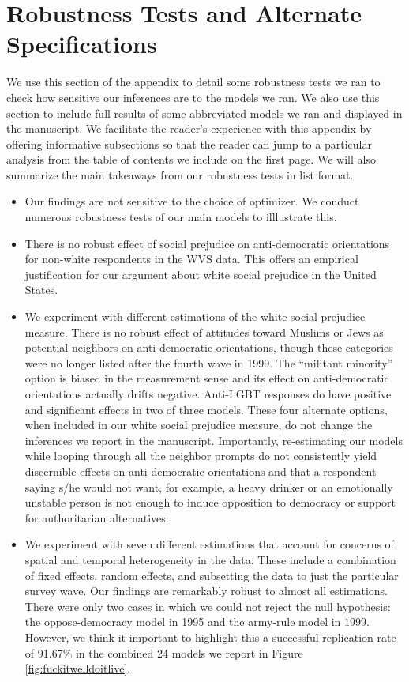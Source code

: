 \documentclass[11pt,]{article}
\providecommand{\tightlist}{%
\setlength{\itemsep}{0pt}\setlength{\parskip}{0pt}}
\begin{document}
\hypertarget{robustness-tests-and-alternate-specifications}{%
\section{Robustness Tests and Alternate
Specifications}\label{robustness-tests-and-alternate-specifications}}

We use this section of the appendix to detail some robustness tests we
ran to check how sensitive our inferences are to the models we ran. We
also use this section to include full results of some abbreviated models
we ran and displayed in the manuscript. We facilitate the reader's
experience with this appendix by offering informative subsections so
that the reader can jump to a particular analysis from the table of
contents we include on the first page. We will also summarize the main
takeaways from our robustness tests in list format.

\begin{itemize}
\tightlist
\item
  Our findings are not sensitive to the choice of optimizer. We conduct
  numerous robustness tests of our main models to illlustrate this.
\item
  There is no robust effect of social prejudice on anti-democratic
  orientations for non-white respondents in the WVS data. This offers an
  empirical justification for our argument about white social prejudice
  in the United States.
\item
  We experiment with different estimations of the white social prejudice
  measure. There is no robust effect of attitudes toward Muslims or Jews
  as potential neighbors on anti-democratic orientations, though these
  categories were no longer listed after the fourth wave in 1999. The
  ``militant minority'' option is biased in the measurement sense and
  its effect on anti-democratic orientations actually drifts negative.
  Anti-LGBT responses do have positive and significant effects in two of
  three models. These four alternate options, when included in our white
  social prejudice measure, do not change the inferences we report in
  the manuscript. Importantly, re-estimating our models while looping
  through all the neighbor prompts do not consistently yield discernible
  effects on anti-democratic orientations and that a respondent saying
  s/he would not want, for example, a heavy drinker or an emotionally
  unstable person is not enough to induce opposition to democracy or
  support for authoritarian alternatives.
\item
  We experiment with seven different estimations that account for
  concerns of spatial and temporal heterogeneity in the data. These
  include a combination of fixed effects, random effects, and subsetting
  the data to just the particular survey wave. Our findings are
  remarkably robust to almost all estimations. There were only two cases
  in which we could not reject the null hypothesis: the oppose-democracy
  model in 1995 and the army-rule model in 1999. However, we think it
  important to highlight this a successful replication rate of 91.67\%
  in the combined 24 models we report in Figure
  \ref{fig:fuckitwelldoitlive}.
\end{itemize}
\end{document}
